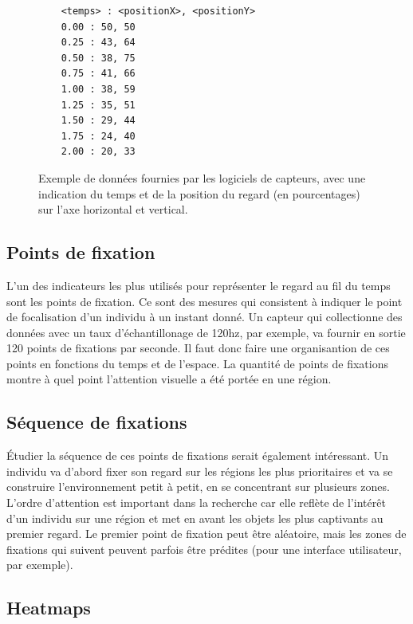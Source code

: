 \documentclass[12pt]{article}
\begin{document}
\begin{figure}[htpb]
  \begin{verbatim}
    <temps> : <positionX>, <positionY>
    0.00 : 50, 50
    0.25 : 43, 64
    0.50 : 38, 75
    0.75 : 41, 66
    1.00 : 38, 59
    1.25 : 35, 51
    1.50 : 29, 44
    1.75 : 24, 40
    2.00 : 20, 33
  \end{verbatim}
  \caption{Exemple de données fournies par les logiciels de capteurs, avec une
    indication du temps et de la position du regard (en pourcentages) sur l'axe
    horizontal et vertical.}
  \label{fig:donnees}
\end{figure}

\subsection{Points de fixation}

L'un des indicateurs les plus utilisés pour représenter le regard au fil du
temps sont les points de fixation. Ce sont des mesures qui consistent à indiquer
le point de focalisation d'un individu à un instant donné. Un capteur qui
collectionne des données avec un taux d'échantillonage de 120hz, par exemple, va
fournir en sortie 120 points de fixations par seconde. Il faut donc faire une
organisantion de ces points en fonctions du temps et de l'espace. La quantité de
points de fixations montre à quel point l'attention visuelle a été portée en une
région.

\subsection{Séquence de fixations}

Étudier la séquence de ces points de fixations serait également intéressant. Un
individu va d'abord fixer son regard sur les régions les plus prioritaires et va
se construire l'environnement petit à petit, en se concentrant sur plusieurs
zones. L'ordre d'attention est important dans la recherche car elle reflète de
l'intérêt d'un individu sur une région et met en avant les objets les plus
captivants au premier regard. Le premier point de fixation peut être aléatoire,
mais les zones de fixations qui suivent peuvent parfois être prédites (pour
une interface utilisateur, par exemple).

\subsection{Heatmaps}
\end{document}
